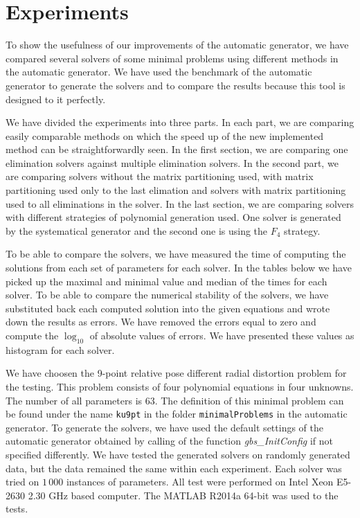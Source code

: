 \chapter{Experiments}
To show the usefulness of our improvements of the automatic generator, we have compared several solvers of some minimal problems using different methods in the automatic generator. We have used the benchmark of the automatic generator to generate the solvers and to compare the results because this tool is designed to it perfectly.

We have divided the experiments into three parts. In each part, we are comparing easily comparable methods on which the speed up of the new implemented method can be straightforwardly seen. In the first section, we are comparing one elimination solvers against multiple elimination solvers. In the second part, we are comparing solvers without the matrix partitioning used, with matrix partitioning used only to the last elimation and solvers with matrix partitioning used to all eliminations in the solver. In the last section, we are comparing solvers with different strategies of polynomial generation used. One solver is generated by the systematical generator and the second one is using the $F_4$ strategy.

To be able to compare the solvers, we have measured the time of computing the solutions from each set of parameters for each solver. In the tables below we have picked up the maximal and minimal value and median of the times for each solver. To be able to compare the numerical stability of the solvers, we have substituted back each computed solution into the given equations and wrote down the results as errors. We have removed the errors equal to zero and compute the $\log_{10}$ of absolute values of errors. We have presented these values as histogram for each solver.

We have choosen the 9-point relative pose different radial distortion problem \cite{9pt} for the testing. This problem consists of four polynomial equations in four unknowns. The number of all parameters is 63. The definition of this minimal problem can be found under the name \texttt{ku9pt} in the folder \texttt{minimalProblems} in the automatic generator. To generate the solvers, we have used the default settings of the automatic generator obtained by calling of the function \textit{gbs\_InitConfig} if not specified differently. We have tested the generated solvers on randomly generated data, but the data remained the same within each experiment. Each solver was tried on $1\,000$ instances of parameters. All test were performed on Intel Xeon E5-2630 2.30 GHz based computer. The MATLAB R2014a 64-bit was used to the tests.

